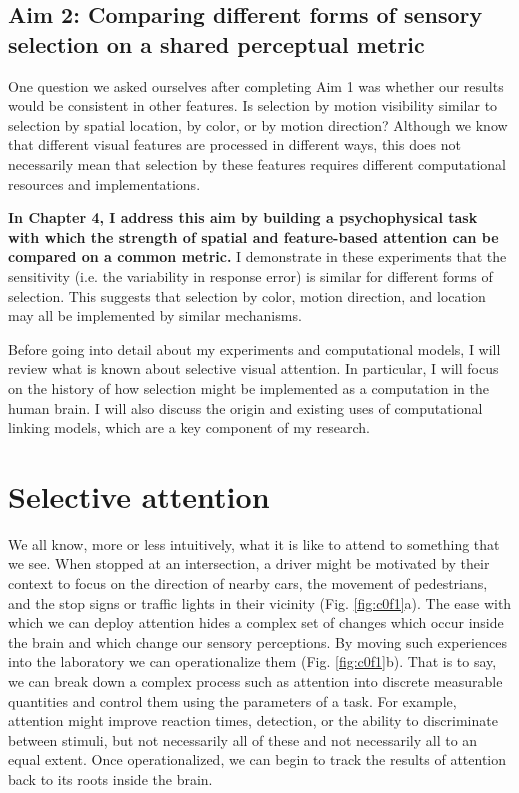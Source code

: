 \subsection{Aim 2: Comparing different forms of sensory selection on a shared perceptual metric}

One question we asked ourselves after completing Aim 1 was whether our results would be consistent in other features. Is selection by motion visibility similar to selection by spatial location, by color, or by motion direction? Although we know that different visual features are processed in different ways, this does not necessarily mean that selection by these features requires different computational resources and implementations.

\textbf{In Chapter 4, I address this aim by building a psychophysical task with which the strength of spatial and feature-based attention can be compared on a common metric.} I demonstrate in these experiments that the sensitivity (i.e. the variability in response error) is similar for different forms of selection. This suggests that selection by color, motion direction, and location may all be implemented by similar mechanisms.

\break

Before going into detail about my experiments and computational models, I will review what is known about selective visual attention. In particular, I will focus on the history of how selection might be implemented as a computation in the human brain. I will also discuss the origin and existing uses of computational linking models, which are a key component of my research.

\section{Selective attention}

We all know, more or less intuitively, what it is like to attend to something that we see. When stopped at an intersection, a driver might be motivated by their context to focus on the direction of nearby cars, the movement of pedestrians, and the stop signs or traffic lights in their vicinity (Fig. \ref{fig:c0f1}a). The ease with which we can deploy attention hides a complex set of changes which occur inside the brain and which change our sensory perceptions. By moving such experiences into the laboratory we can operationalize them (Fig. \ref{fig:c0f1}b). That is to say, we can break down a complex process such as attention into discrete measurable quantities and control them using the parameters of a task. For example, attention might improve reaction times, detection, or the ability to discriminate between stimuli, but not necessarily all of these and not necessarily all to an equal extent. Once operationalized, we can begin to track the results of attention back to its roots inside the brain.

